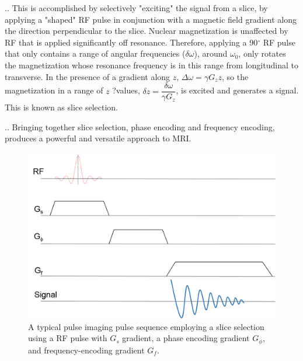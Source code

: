 \documentclass[handout]{beamer}
\begin{document}
\begin{frame}{\thesection.\thesubsection. \insertsubsection}
   This is accomplished by selectively "exciting" the signal from a slice, by
  applying a "shaped" RF pulse in conjunction with a magnetic field
  gradient along the direction perpendicular to the slice.
  Nuclear magnetization is unaffected by RF that is applied
  significantly off resonance. Therefore, applying a
  90$^\circ$ RF pulse that only contains a range of angular frequencies
  ($\delta \omega$), around $\omega_0$, only rotates the magnetization whose
  resonance frequency is in this range from longitudinal to
  transverse. In the presence of a gradient along $z$, $\Delta \omega = \gamma G_z z$, so
  the magnetization in a range of $z$ ?values, $\delta z = \dfrac{\delta \omega}{\gamma G_z}  $, is excited and generates a signal. This is known as slice selection.

\end{frame}

\begin{frame}{\thesection.\thesubsection. \insertsubsection}
  Bringing together slice selection, phase encoding and frequency encoding, produces a powerful and versatile approach to MRI.
  
   \begin{figure}
  	\centering
  	\includegraphics[scale=0.45]{figures/slice_selection2.png}
  	\caption{A typical pulse imaging pulse sequence employing a slice selection using a RF pulse with $G_s$ gradient, a phase encoding gradient $G_{\phi}$, and frequency-encoding gradient $G_f$. }
  \end{figure}  
\end{frame}
\end{document}
